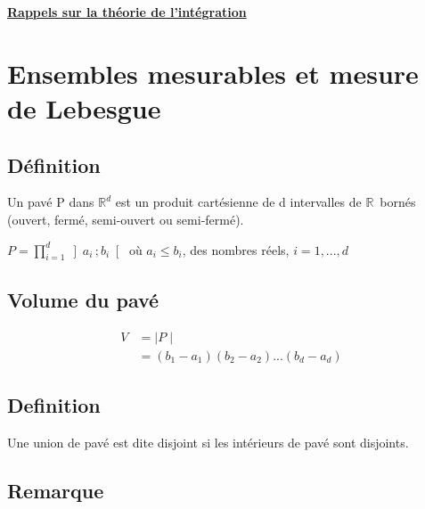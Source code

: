 \documentclass[12pt]{article}
\let\big\mathbb
\newcommand{\R}{\ensuremath{\big{R}}}
\newcommand{\Rn}[1]{\ensuremath{\big{R}^{#1}}}
\begin{document}
    \begin{center}
        \begin{LARGE}
        \underline{\textbf{Rappels sur la théorie de l'intégration}}\\
        \end{LARGE}
    \end{center}
	
	\section{Ensembles mesurables et mesure de Lebesgue}
		\subsection*{Définition}
		Un pavé P dans \Rn{d} est un produit cartésienne de d intervalles de \R \, bornés (ouvert, fermé, semi-ouvert ou semi-fermé).
		\begin{center}
		$ P = \prod^{d}_{i=1}\left]a_{i}\, ; b_{i} \right[ $ où $ a_{i} \leq b_{i}$, des nombres réels, $i = 1, ..., d$
		\end{center}
		
		\subsection*{Volume du pavé}
		\noindent \begin{align*}
		V 	&= \mid P\mid \\
			&= (b_{1} - a_{1})(b_{2} - a_{2})...(b_{d} - a_{d})
		\end{align*}
		
		\subsection*{Definition}
		Une union de pavé est dite disjoint si les intérieurs de pavé sont disjoints.
		
		\subsection*{Remarque}
\end{document}
